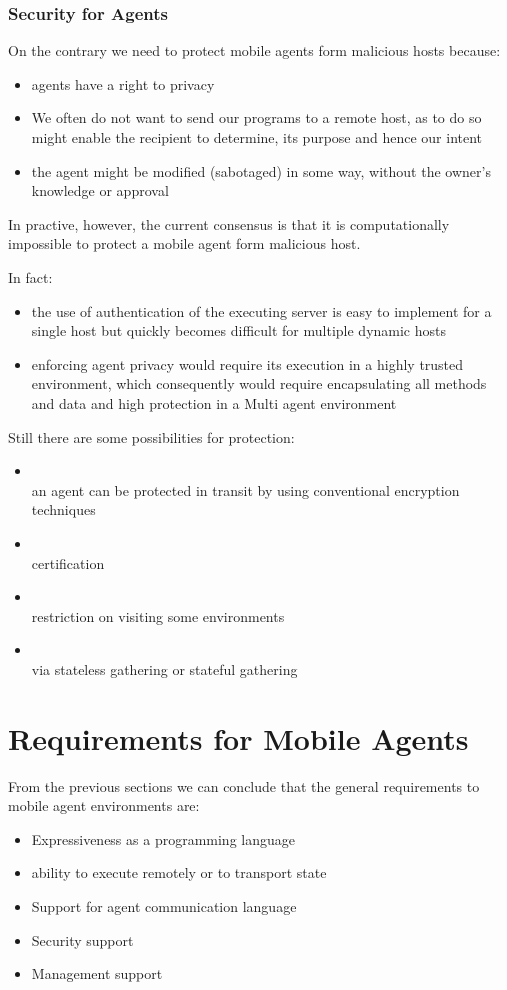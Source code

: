 \subsubsection{Security for Agents}
On the contrary we need to protect mobile agents form malicious hosts because:
\begin{itemize}
\item agents have a right to privacy
\item We often do not want to send our programs to a remote host, as to do so might enable the recipient to determine, its purpose and hence our intent
\item the agent might be modified (sabotaged) in some way, without the owner's knowledge or approval
\end{itemize}

In practive, however, the current consensus is that it is computationally impossible to protect a mobile agent form malicious host.

In fact:
\begin{itemize}
\item the use of authentication of the executing server is easy to implement for a single host but quickly becomes difficult for multiple dynamic hosts
\item enforcing agent privacy would require its execution in a highly trusted environment, which consequently would require encapsulating all methods and data and high protection in a Multi agent environment
\end{itemize}

Still there are some possibilities for protection:
\begin{itemize}
\item {}\\
an agent can be protected in transit by using conventional encryption techniques
\item{}\\
certification
\item {}\\
restriction on visiting some environments
\item {}\\
via stateless gathering or stateful gathering
\end{itemize}
\section{Requirements for Mobile Agents}

From the previous sections we can conclude that the general requirements to mobile agent environments are:
\begin{itemize}
\item Expressiveness as a programming language
\item ability to execute remotely or to transport state
\item Support for agent communication language
\item Security support
\item Management support
\end{itemize}